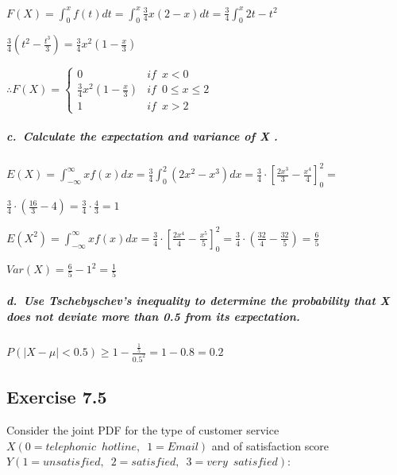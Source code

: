 \documentclass[
]{article}
\begin{document}
\(\displaystyle F(X) = \int_{0}^x f(t) dt = \int_0^x \frac{3}{4}x(2-x)dt = \frac{3}{4} \int_0^x2t - t^2\)

\(\displaystyle \frac{3}{4}(t^2 - \frac{t^3}{3}) = \frac{3}{4}x^2(1-\frac{x}{3})\)

\(\therefore F(X) = \left\{ \begin{array}{ll} 0 & if \enspace x <0 \\ \frac{3}{4}x^2(1-\frac{x}{3}) & if \enspace 0 \leq x \leq 2 \\ 1 & if \enspace x > 2 \end{array} \right.\)

\hypertarget{c.-calculate-the-expectation-and-variance-of-x-.}{%
\subparagraph{c.~Calculate the expectation and variance of X
.}\label{c.-calculate-the-expectation-and-variance-of-x-.}}

\(\displaystyle E(X) = \int_{-\infty}^\infty x f(x)dx = \frac{3}{4} \int_0^2 (2x^2 - x^3)dx = \frac{3}{4} \cdot \left[ \frac{2x^3}{3} -\frac{x^4}{4}\right]_0^2 =\)

\(\displaystyle \frac{3}{4} \cdot \left( \frac{16}{3} - 4\right) = \frac{3}{4} \cdot \frac{4}{3} = 1\)

\(\displaystyle E(X^2) = \int_{-\infty}^\infty x f(x)dx = \frac{3}{4} \cdot \left[ \frac{2x^4}{4} -\frac{x^5}{5}\right]_0^2 = \frac{3}{4} \cdot \left( \frac{32}{4} - \frac{32}{5} \right) = \frac{6}{5}\)

\(\displaystyle Var(X) = \frac{6}{5} - 1^2 = \frac{1}{5}\)

\hypertarget{d.-use-tschebyschevs-inequality-to-determine-the-probability-that-x-does-not-deviate-more-than-0.5-from-its-expectation.}{%
\subparagraph{d.~Use Tschebyschev's inequality to determine the
probability that X does not deviate more than 0.5 from its
expectation.}\label{d.-use-tschebyschevs-inequality-to-determine-the-probability-that-x-does-not-deviate-more-than-0.5-from-its-expectation.}}

\(P(|X - \mu| < 0.5) \geq 1 - \frac{\frac{1}{5}}{0.5^2} = 1 - 0.8 = 0.2\)

\hypertarget{exercise-7.5}{%
\subsection{Exercise 7.5}\label{exercise-7.5}}

Consider the joint PDF for the type of customer service
\(X (0 = telephonic \enspace hotline, \enspace 1 = Email)\) and of
satisfaction score
\(Y (1 = unsatisfied, \enspace 2 = satisfied, \enspace 3 = very \enspace satisfied)\):
\end{document}
